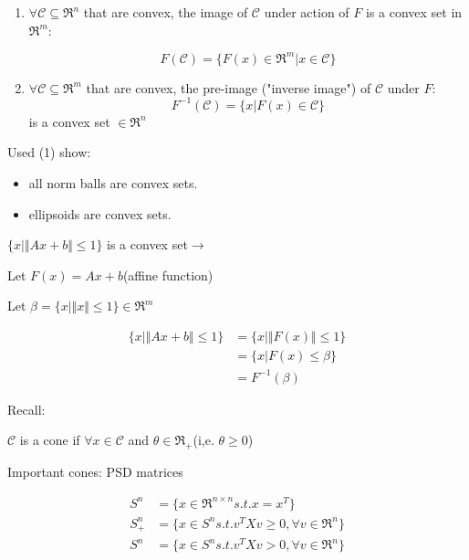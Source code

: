\begin{enumerate}
	\item $\forall \mathcal{C}\subseteq \Re^n$ that are convex, the image of $\mathcal{C}$ under action of $F$ is a convex set in $\Re^m$:
	
	\begin{equation*}
	F(\mathcal{C}) = \{F(x)\in \Re^m \vert x\in \mathcal{C} \}
	\end{equation*}
	
	\item $\forall \mathcal{C}\subseteq \Re^m$ that are convex, the pre-image ("inverse image") of $\mathcal{C}$ under $F$: 
	\begin{equation*}
	F^{-1}(\mathcal{C}) = \{x| F(x)\in \mathcal{C} \}
	\end{equation*}
	is a convex set $\in \Re^n$
\end{enumerate}

Used (1) show:
\begin{itemize}
	\item all norm balls are convex sets.
	
	\item ellipsoids are convex sets.
\end{itemize}

\begin{example}
	$\{x|\Vert Ax + b\Vert \leq 1 \}$ is a convex set$\rightarrow$ 
	
	Let $F(x) = Ax + b$(affine function)
	
	Let $\beta = \{x|\Vert x \Vert \leq 1 \}\in \Re^m$
	
	\begin{align*}
	\{x|\Vert Ax+b\Vert\leq 1 \} &= \{x|\Vert F(x) \Vert\leq 1 \}\\
	&= \{x|F(x) \leq \beta \}\\
	&= F^{-1}(\beta)
	\end{align*}
\end{example}


Recall:

$\mathcal{C}$ is a cone if $\forall x\in \mathcal{C}$ and $\theta \in \Re_{+}$(i,e. $\theta \geq 0$)   

Important cones: PSD matrices   


\begin{align*}
S^n &= \{x\in \Re^{n\times n}s.t. x = x^T \}\\
S^n_+ &= \{x\in S^{n}s.t. v^TXv \geq 0, \forall v\in \Re^n \}\\
S^n &= \{x\in S^{n}s.t. v^TXv > 0 ,\forall v\in \Re^n\}
\end{align*}

